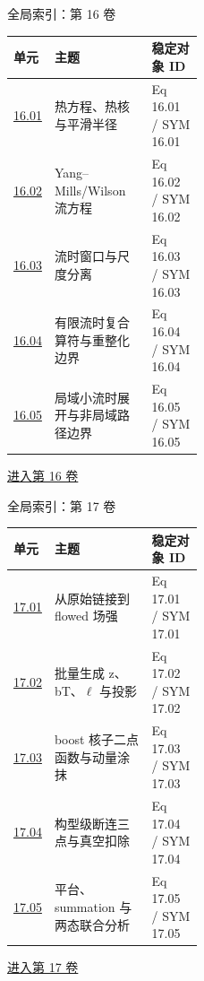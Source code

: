 \documentclass[aspectratio=169,10pt]{ctexbeamer}
\begin{document}
\begin{frame}[t]{全局索引：第 16 卷}
\small\begin{tabularx}{\linewidth}{p{0.15\linewidth}Yp{0.27\linewidth}}
\toprule 单元 & 主题 & 稳定对象 ID\\\midrule
\hyperlink{Fr:16.01-1}{16.01} & 热方程、热核与平滑半径 & Eq 16.01 / SYM 16.01\\
\hyperlink{Fr:16.02-1}{16.02} & Yang--Mills/\allowbreak{}Wilson 流方程 & Eq 16.02 / SYM 16.02\\
\hyperlink{Fr:16.03-1}{16.03} & 流时窗口与尺度分离 & Eq 16.03 / SYM 16.03\\
\hyperlink{Fr:16.04-1}{16.04} & 有限流时复合算符与重整化边界 & Eq 16.04 / SYM 16.04\\
\hyperlink{Fr:16.05-1}{16.05} & 局域小流时展开与非局域路径边界 & Eq 16.05 / SYM 16.05\\
\bottomrule\end{tabularx}
\vfill\hyperlink{Fr:V16-title}{进入第 16 卷}
\end{frame}

\begin{frame}[t]{全局索引：第 17 卷}
\small\begin{tabularx}{\linewidth}{p{0.15\linewidth}Yp{0.27\linewidth}}
\toprule 单元 & 主题 & 稳定对象 ID\\\midrule
\hyperlink{Fr:17.01-1}{17.01} & 从原始链接到 flowed 场强 & Eq 17.01 / SYM 17.01\\
\hyperlink{Fr:17.02-1}{17.02} & 批量生成 z、bT、\ensuremath{\ell} 与投影 & Eq 17.02 / SYM 17.02\\
\hyperlink{Fr:17.03-1}{17.03} & boost 核子二点函数与动量涂抹 & Eq 17.03 / SYM 17.03\\
\hyperlink{Fr:17.04-1}{17.04} & 构型级断连三点与真空扣除 & Eq 17.04 / SYM 17.04\\
\hyperlink{Fr:17.05-1}{17.05} & 平台、summation 与两态联合分析 & Eq 17.05 / SYM 17.05\\
\bottomrule\end{tabularx}
\vfill\hyperlink{Fr:V17-title}{进入第 17 卷}
\end{frame}
\end{document}
